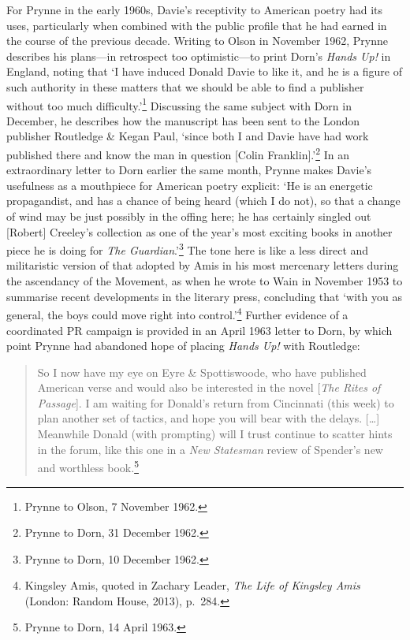 \documentclass[]{article}
\begin{document}
For Prynne in the early 1960s, Davie’s receptivity to American poetry
had its uses, particularly when combined with the public profile that he
had earned in the course of the previous decade. Writing to Olson in
November 1962, Prynne describes his plans—in retrospect too
optimistic—to print Dorn’s \emph{Hands Up!} in England, noting that ‘I
have induced Donald Davie to like it, and he is a figure of such
authority in these matters that we should be able to find a publisher
without too much difficulty.’\footnote{Prynne to Olson, 7 November 1962.}
Discussing the same subject with Dorn in December, he describes how the
manuscript has been sent to the London publisher Routledge \& Kegan
Paul, ‘since both I and Davie have had work published there and know the
man in question {[}Colin Franklin{]}.’\footnote{Prynne to Dorn, 31
  December 1962.} In an extraordinary letter to Dorn earlier the same
month, Prynne makes Davie’s usefulness as a mouthpiece for American
poetry explicit: ‘He is an energetic propagandist, and has a chance of
being heard (which I do not), so that a change of wind may be just
possibly in the offing here; he has certainly singled out {[}Robert{]}
Creeley’s collection as one of the year’s most exciting books in another
piece he is doing for \emph{The Guardian}.’\footnote{Prynne to Dorn, 10
  December 1962.} The tone here is like a less direct and militaristic
version of that adopted by Amis in his most mercenary letters during the
ascendancy of the Movement, as when he wrote to Wain in November 1953 to
summarise recent developments in the literary press, concluding that
‘with you as general, the boys could move right into control.’\footnote{Kingsley
  Amis, quoted in Zachary Leader, \emph{The Life of Kingsley Amis}
  (London: Random House, 2013), p.~284.} Further evidence of a
coordinated PR campaign is provided in an April 1963 letter to Dorn, by
which point Prynne had abandoned hope of placing \emph{Hands Up!} with
Routledge:

\begin{quote}
\singlespacing So I now have my eye on Eyre \& Spottiswoode, who have
published American verse and would also be interested in the novel
{[}\emph{The Rites of Passage}{]}. I am waiting for Donald’s return from
Cincinnati (this week) to plan another set of tactics, and hope you will
bear with the delays. {[}\ldots{}{]} Meanwhile Donald (with prompting)
will I trust continue to scatter hints in the forum, like this one in a
\emph{New Statesman} review of Spender’s new and worthless
book.\footnote{Prynne to Dorn, 14 April 1963.}
\end{quote}
\end{document}
